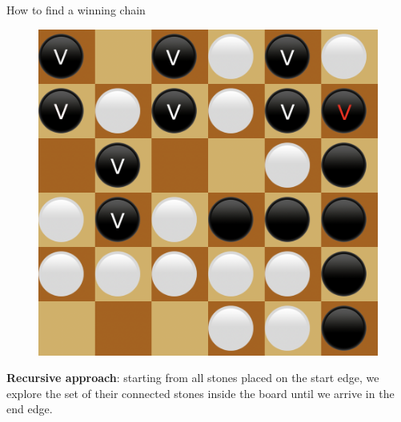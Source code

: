 \documentclass{beamer}
\begin{document}
\begin{frame}{How to find a winning chain}
{		\begin{figure}[t]
			\includegraphics[scale=0.2]{images/chain/9.png}
		\end{figure}
		
		\textbf{Recursive approach}: starting from all stones placed on the start edge, we explore the set of their connected stones inside the board until we arrive in the end edge.
	}

\end{frame}
\end{document}
